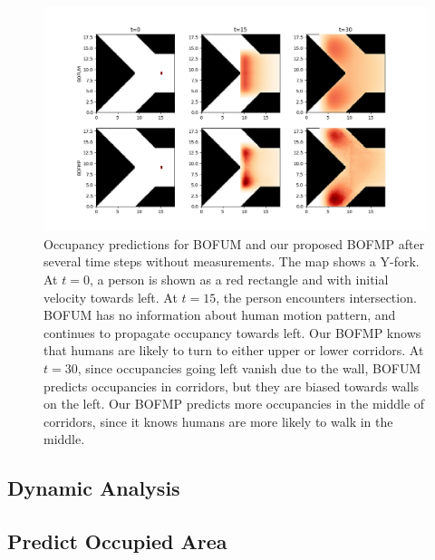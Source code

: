 \begin{figure}[ht]
  \centering
    \includegraphics[width=\textwidth]{figures/idea.png}
    \caption{Occupancy predictions for BOFUM and our proposed BOFMP after several time steps without measurements. The map shows a Y-fork. At $t=0$, a person is shown as a red rectangle and with initial velocity towards left. At $t=15$, the person encounters intersection. BOFUM has no information about human motion pattern, and continues to propagate occupancy towards left. Our BOFMP knows that humans are likely to turn to either upper or lower corridors. At $t=30$, since occupancies going left vanish due to the wall, BOFUM predicts occupancies in corridors, but they are biased towards walls on the left. Our BOFMP predicts more occupancies in the middle of corridors, since it knows humans are more likely to walk in the middle.}
    \label{fig:idea}
\end{figure}

\subsection{Dynamic Analysis}
\subsection{Predict Occupied Area}

